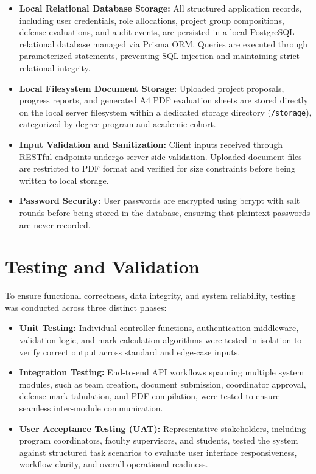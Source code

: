 \documentclass[12pt,a4paper]{report}
\begin{document}
\begin{itemize}
  \item \textbf{Local Relational Database Storage:} All structured application records, including user credentials, role allocations, project group compositions, defense evaluations, and audit events, are persisted in a local PostgreSQL relational database managed via Prisma ORM. Queries are executed through parameterized statements, preventing SQL injection and maintaining strict relational integrity.
  
  \item \textbf{Local Filesystem Document Storage:} Uploaded project proposals, progress reports, and generated A4 PDF evaluation sheets are stored directly on the local server filesystem within a dedicated storage directory (\texttt{/storage}), categorized by degree program and academic cohort.
  
  \item \textbf{Input Validation and Sanitization:} Client inputs received through RESTful endpoints undergo server-side validation. Uploaded document files are restricted to PDF format and verified for size constraints before being written to local storage.
  
  \item \textbf{Password Security:} User passwords are encrypted using bcrypt with salt rounds before being stored in the database, ensuring that plaintext passwords are never recorded.
\end{itemize}

\section{Testing and Validation}
To ensure functional correctness, data integrity, and system reliability, testing was conducted across three distinct phases:

\begin{itemize}
  \item \textbf{Unit Testing:} Individual controller functions, authentication middleware, validation logic, and mark calculation algorithms were tested in isolation to verify correct output across standard and edge-case inputs.
  
  \item \textbf{Integration Testing:} End-to-end API workflows spanning multiple system modules, such as team creation, document submission, coordinator approval, defense mark tabulation, and PDF compilation, were tested to ensure seamless inter-module communication.
  
  \item \textbf{User Acceptance Testing (UAT):} Representative stakeholders, including program coordinators, faculty supervisors, and students, tested the system against structured task scenarios to evaluate user interface responsiveness, workflow clarity, and overall operational readiness.
\end{itemize}
\end{document}
